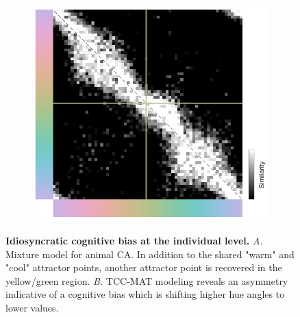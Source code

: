 {\begin{figure}
    \centering
    \begin{subfigure}[t]{0.49\textwidth}
         \centering
         \caption{}
         
         \label{fig:CastorMM}
    \end{subfigure}
    \hfill
    \begin{subfigure}[t]{0.49\textwidth}
         \centering
         \caption{}
         \includegraphics[width=\textwidth]{../Figures/working/F5_CastorCogBias/sm_18_231110-202911.png}
         \label{fig:Castor-FreeSimilarity}
    \end{subfigure}
    \caption{\textbf{Idiosyncratic cognitive bias at the individual level.} 
    \emph{A.} Mixture model for animal CA. In addition to the shared "warm" and "cool" attractor points, another attractor point is recovered in the yellow/green region.
    \emph{B.} TCC-MAT modeling reveals an asymmetry indicative of a cognitive bias which is shifting higher hue angles to lower values.}
    \label{fig:IndiDataCogBias}
\end{figure}

}

